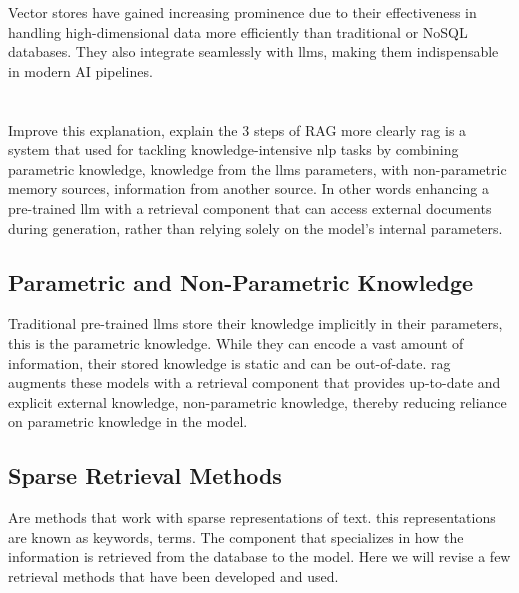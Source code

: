 Vector stores have gained increasing prominence due to their effectiveness in handling high-dimensional data more efficiently than traditional or NoSQL databases. They also integrate seamlessly with \glspl{llm}, making them indispensable in modern AI pipelines.


\section{}
Improve this explanation, explain the 3 steps of RAG more clearly
\gls{rag} is a system that used for tackling knowledge-intensive \gls{nlp} tasks by combining parametric knowledge, knowledge from the \gls{llm}s parameters,  with non-parametric memory sources, information from another source. In other words enhancing a pre-trained \gls{llm} with a retrieval component that can access external documents during generation, rather than relying solely on the model's internal parameters.
\subsection{Parametric and Non-Parametric Knowledge}
Traditional pre-trained \glspl{llm} store their knowledge implicitly in their parameters, this is the parametric knowledge. While they can encode a vast amount of information, their stored knowledge is static and can be out-of-date. \gls{rag} augments these models with a retrieval component that provides up-to-date and explicit external knowledge, non-parametric knowledge, thereby reducing reliance on parametric knowledge in the model.

\subsection{Sparse Retrieval Methods}
Are methods that work with sparse representations of text. this representations are known as keywords, terms.
The component that specializes in how the information is retrieved from the database to the model. Here we will revise a few retrieval methods that have been developed and used.
